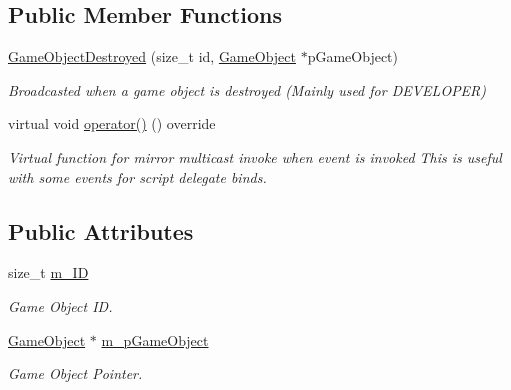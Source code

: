 \subsection*{Public Member Functions}
\begin{DoxyCompactItemize}
\item 
\hyperlink{classGameObjectDestroyed_a0439ed5e9851a520720b6c1f2dbe5858}{Game\+Object\+Destroyed} (size\+\_\+t id, \hyperlink{classGameObject}{Game\+Object} $\ast$p\+Game\+Object)
\begin{DoxyCompactList}\small\item\em Broadcasted when a game object is destroyed (Mainly used for D\+E\+V\+E\+L\+O\+P\+ER) \end{DoxyCompactList}\item 
\mbox{\label{classGameObjectDestroyed_a4eb87552d5a6c40e7445f07604f46bec}} 
virtual void \hyperlink{classGameObjectDestroyed_a4eb87552d5a6c40e7445f07604f46bec}{operator()} () override
\begin{DoxyCompactList}\small\item\em Virtual function for mirror multicast invoke when event is invoked This is useful with some events for script delegate binds. \end{DoxyCompactList}\end{DoxyCompactItemize}
\subsection*{Public Attributes}
\begin{DoxyCompactItemize}
\item 
\mbox{\label{classGameObjectDestroyed_ad70b8e287693b613fbbe3e4ada72ac94}} 
size\+\_\+t \hyperlink{classGameObjectDestroyed_ad70b8e287693b613fbbe3e4ada72ac94}{m\+\_\+\+ID}
\begin{DoxyCompactList}\small\item\em Game Object ID. \end{DoxyCompactList}\item 
\mbox{\label{classGameObjectDestroyed_a0e3d1d731a0a45bff5b3fd4fba04a904}} 
\hyperlink{classGameObject}{Game\+Object} $\ast$ \hyperlink{classGameObjectDestroyed_a0e3d1d731a0a45bff5b3fd4fba04a904}{m\+\_\+p\+Game\+Object}
\begin{DoxyCompactList}\small\item\em Game Object Pointer. \end{DoxyCompactList}\end{DoxyCompactItemize}
